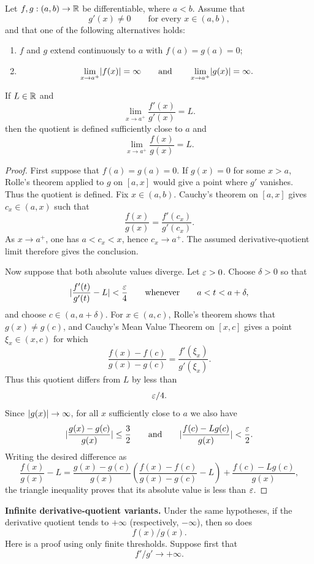 \begin{theorem}
\label{thm:lhopital}
Let $f,g:(a,b)\to\mathbb{R}$ be differentiable, where $a<b$. Assume that
\[
g'(x)\ne0
\qquad\text{for every }x\in(a,b),
\]
and that one of the following alternatives holds:
\begin{enumerate}
\item $f$ and $g$ extend continuously to $a$ with $f(a)=g(a)=0$;
\item
\[
\lim_{x\to a^+}\lvert f(x)\rvert=\infty
\qquad\text{and}\qquad
\lim_{x\to a^+}\lvert g(x)\rvert=\infty.
\]
\end{enumerate}
If $L\in\mathbb{R}$ and
\[
\lim_{x\to a^+}\frac{f'(x)}{g'(x)}=L.
\]
then the quotient is defined sufficiently close to $a$ and
\[
\lim_{x\to a^+}\frac{f(x)}{g(x)}=L.
\]
\end{theorem}
\begin{proof}
First suppose that $f(a)=g(a)=0$. If $g(x)=0$ for some $x>a$, Rolle's theorem
applied to $g$ on $[a,x]$ would give a point where $g'$ vanishes. Thus the
quotient is defined. Fix $x\in(a,b)$. Cauchy's theorem on $[a,x]$ gives
$c_x\in(a,x)$ such that
\[
\frac{f(x)}{g(x)}=\frac{f'(c_x)}{g'(c_x)}.
\]
As $x\to a^+$, one has $a<c_x<x$, hence $c_x\to a^+$. The assumed derivative-quotient limit therefore gives the conclusion.

Now suppose that both absolute values diverge. Let $\varepsilon>0$. Choose
$\delta>0$ so that
\[
\lvert \frac{f'(t)}{g'(t)}-L\rvert<\frac{\varepsilon}{4}
\qquad\text{whenever}\qquad
a<t<a+\delta,
\]
and choose $c\in(a,a+\delta)$. For $x\in(a,c)$, Rolle's theorem shows that
$g(x)\ne g(c)$, and Cauchy's Mean Value Theorem on $[x,c]$ gives a point
$\xi_x\in(x,c)$ for which
\[
\frac{f(x)-f(c)}{g(x)-g(c)}
=\frac{f'(\xi_x)}{g'(\xi_x)}.
\]
Thus this quotient differs from $L$ by less than
\[
\varepsilon/4.
\]
 Since
$\lvert g(x)\rvert\to\infty$, for all $x$ sufficiently close to $a$ we also have
\[
\lvert \frac{g(x)-g(c)}{g(x)}\rvert\leq\frac32
\qquad\text{and}\qquad
\lvert \frac{f(c)-Lg(c)}{g(x)}\rvert<\frac{\varepsilon}{2}.
\]
Writing the desired difference as
\[
\frac{f(x)}{g(x)}-L
=\frac{g(x)-g(c)}{g(x)}
\left(\frac{f(x)-f(c)}{g(x)-g(c)}-L\right)
+\frac{f(c)-Lg(c)}{g(x)},
\]
the triangle inequality proves that its absolute value is less than $\varepsilon$.
\end{proof}

\noindent\textbf{Infinite derivative-quotient variants.} Under the same
hypotheses, if the derivative quotient tends to $+\infty$ (respectively,
$-\infty$), then so does
\[
f(x)/g(x).
\]
 Here is a proof using only finite
thresholds. Suppose first that
\[
f'/g'\to+\infty.
\]


